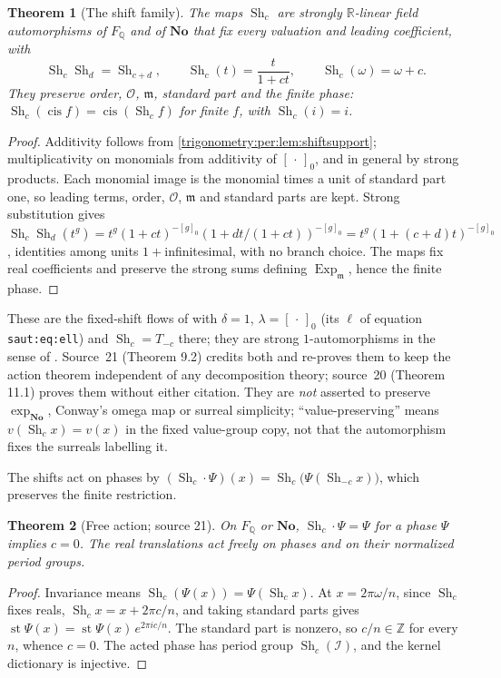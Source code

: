 \documentclass[11pt,letterpaper]{article}
\numberwithin{equation}{section}
\newtheorem{theorem}{Theorem}[section]
\theoremstyle{definition}
\theoremstyle{remark}
\newcommand{\No}{\mathbf{No}}
\newcommand{\R}{\mathbb R}
\newcommand{\Q}{\mathbb Q}
\newcommand{\Z}{\mathbb Z}
\newcommand{\OO}{\mathcal O}
\newcommand{\mm}{\mathfrak m}
\newcommand{\st}{\operatorname{st}}
\newcommand{\cis}{\operatorname{cis}}
\newcommand{\Ex}{\operatorname{Exp}_{\mm}}
\newcommand{\Sh}{\operatorname{Sh}}
\newcommand{\cI}{\mathcal I}
\begin{document}
\begin{theorem}[The shift family]\label{trigonometry:per:thm:shifts}
The maps $\Sh_c$ are strongly $\R$-linear field automorphisms of $F_{\Q}$ and of $\No$ that fix every
valuation and leading coefficient, with
\[
 \Sh_c\Sh_d=\Sh_{c+d},\qquad \Sh_c(t)=\frac{t}{1+ct},\qquad \Sh_c(\omega)=\omega+c .
\]
They preserve order, $\OO$, $\mm$, standard part and the finite phase:
$\Sh_c(\cis f)=\cis(\Sh_cf)$ for finite $f$, with $\Sh_c(i)=i$.
\end{theorem}
\begin{proof}
Additivity follows from \cref{trigonometry:per:lem:shiftsupport}; multiplicativity on monomials from
additivity of $[\,\cdot\,]_0$, and in general by strong products. Each monomial image is the monomial
times a unit of standard part one, so leading terms, order, $\OO$, $\mm$ and standard parts are kept.
Strong substitution gives $\Sh_c\Sh_d(t^g)=t^g(1+ct)^{-[g]_0}(1+dt/(1+ct))^{-[g]_0}=t^g(1+(c+d)t)^{-[g]_0}$,
identities among units $1+{}$infinitesimal, with no branch choice. The maps fix real coefficients and
preserve the strong sums defining $\Ex$, hence the finite phase.
\end{proof}
These are the fixed-shift flows of \cite[Theorem 5.2]{Saut} with $\delta=1$, $\lambda=[\,\cdot\,]_0$
(its $\ell$ of equation \texttt{saut:eq:ell}) and $\Sh_c=T_{-c}$ there; they are strong
$1$-automorphisms in the sense of \cite[\S4]{KKS}. Source~21 (Theorem 9.2) credits both and re-proves
them to keep the action theorem independent of any decomposition theory; source~20 (Theorem 11.1) proves
them without either citation. They are \emph{not} asserted to preserve $\exp_{\No}$, Conway's omega map
or surreal simplicity; ``value-preserving'' means $v(\Sh_cx)=v(x)$ in the fixed value-group copy, not
that the automorphism fixes the surreals labelling it.

The shifts act on phases by $(\Sh_c\cdot\Psi)(x)=\Sh_c\bigl(\Psi(\Sh_{-c}x)\bigr)$, which preserves the
finite restriction.

\begin{theorem}[Free action; source 21]\label{trigonometry:per:thm:free}
On $F_{\Q}$ or $\No$, $\Sh_c\cdot\Psi=\Psi$ for a phase $\Psi$ implies $c=0$. The real translations act
freely on phases and on their normalized period groups.
\end{theorem}
\begin{proof}
Invariance means $\Sh_c(\Psi(x))=\Psi(\Sh_cx)$. At $x=2\pi\omega/n$, since $\Sh_c$ fixes reals,
$\Sh_c x=x+2\pi c/n$, and taking standard parts gives $\st\Psi(x)=\st\Psi(x)\,e^{2\pi ic/n}$. The
standard part is nonzero, so $c/n\in\Z$ for every $n$, whence $c=0$. The acted phase has period group
$\Sh_c(\cI)$, and the kernel dictionary is injective.
\end{proof}
\end{document}
